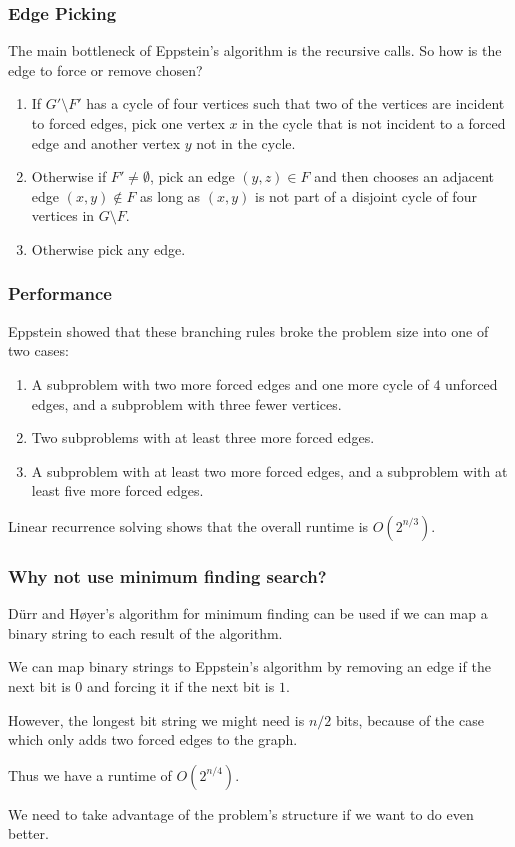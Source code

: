 \documentclass[]{beamer}
\begin{document}
\begin{frame}
\frametitle{Edge Picking}
The main bottleneck of Eppstein's algorithm is the recursive calls. So how is the edge to force or remove chosen?

\begin{enumerate}
\item If $G' \setminus F'$ has a cycle of four vertices such that two of the vertices are incident to forced edges, pick one vertex $x$ in the cycle that is not incident to a forced edge and another vertex $y$ not in the cycle.
\item Otherwise if $F' \neq \emptyset$, pick an edge $(y, z) \in F$ and then chooses an adjacent edge $(x, y) \notin F$ as long as $(x, y)$ is not part of a disjoint cycle of four vertices in $G \setminus F$.
\item Otherwise pick any edge.
\end{enumerate}

\end{frame}

\begin{frame}
\frametitle{Performance}
Eppstein showed that these branching rules broke the problem size into one of two cases:

\begin{enumerate}
\item A subproblem with two more forced edges and one more cycle of $4$ unforced edges, and a subproblem with three fewer vertices.
\item Two subproblems with at least three more forced edges.
\item A subproblem with at least two more forced edges, and a subproblem with at least five more forced edges.
\end{enumerate}

Linear recurrence solving shows that the overall runtime is $O(2^{n/3})$.
\end{frame}

\begin{frame}
\frametitle{Why not use minimum finding search?}
D\"urr and H\o yer's algorithm for minimum finding can be used if we can map a binary string to each result of the algorithm.

We can map binary strings to Eppstein's algorithm by removing an edge if the next bit is $0$ and forcing it if the next bit is $1$.

However, the longest bit string we might need is $n/2$ bits, because of the case which only adds two forced edges to the graph.

Thus we have a runtime of $O(2^{n/4})$.

We need to take advantage of the problem's structure if we want to do even better.
\end{frame}
\end{document}

